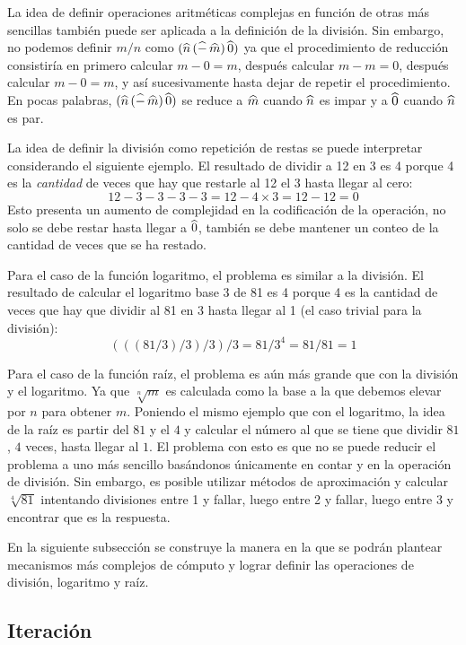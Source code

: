 La idea de definir operaciones aritméticas complejas en función de otras más sencillas también puede ser aplicada a la definición de la división. Sin embargo, no podemos definir $ m/n $ como $ (\widehat{n}\, (\widehat{-}\, \widehat{m})\, \widehat{0}) $ ya que el procedimiento de reducción consistiría en primero calcular $ m-0 = m $, después calcular $ m-m = 0 $, después calcular $ m-0=m $, y así sucesivamente hasta dejar de repetir el procedimiento. En pocas palabras, $ (\widehat{n}\, (\widehat{-}\, \widehat{m})\, \widehat{0}) $ se reduce a $ \widehat{m} $ cuando $ \widehat{n} $ es impar y a $ \widehat{0} $ cuando $ \widehat{n} $ es par.

La idea de definir la división como repetición de restas se puede interpretar considerando el siguiente ejemplo. El resultado de dividir a 12 en 3 es 4 porque 4 es la \emph{cantidad} de veces que hay que restarle al 12 el 3 hasta llegar al cero:
\[ 12-3-3-3-3=12-4\times 3=12-12=0 \]
Esto presenta un aumento de complejidad en la codificación de la operación, no solo se debe restar hasta llegar a $ \widehat{0} $, también se debe mantener un conteo de la cantidad de veces que se ha restado.

Para el caso de la función logaritmo, el problema es similar a la división. El resultado de calcular el logaritmo base 3 de 81 es 4 porque 4 es la cantidad de veces que hay que dividir al 81 en 3 hasta llegar al 1 (el caso trivial para la división):
\[ (((81/3)/3)/3)/3 = 81/3^{4} = 81/81 = 1 \]

Para el caso de la función raíz, el problema es aún más grande que con la división y el logaritmo. Ya que $ \sqrt[n]{m} $ es calculada como la base a la que debemos elevar por $ n $ para obtener $ m $. Poniendo el mismo ejemplo que con el logaritmo, la idea de la raíz es partir del $ 81 $ y el $ 4 $ y calcular el número al que se tiene que dividir $ 81 $, $ 4 $ veces, hasta llegar al $ 1 $. El problema con esto es que no se puede reducir el problema a uno más sencillo basándonos únicamente en contar y en la operación de división. Sin embargo, es posible utilizar métodos de aproximación y calcular $ \sqrt[4]{81} $ intentando divisiones entre 1 y fallar, luego entre 2 y fallar, luego entre 3 y encontrar que es la respuesta.

En la siguiente subsección se construye la manera en la que se podrán plantear mecanismos más complejos de cómputo y lograr definir las operaciones de división, logaritmo y raíz.



\subsection{Iteración}
\label{sec:iteracion}

